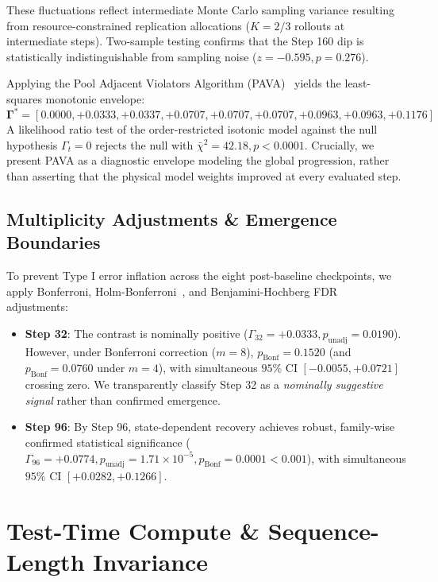 \documentclass[11pt]{article}
\begin{document}
These fluctuations reflect intermediate Monte Carlo sampling variance resulting from resource-constrained replication allocations ($K=2/3$ rollouts at intermediate steps). Two-sample testing confirms that the Step 160 dip is statistically indistinguishable from sampling noise ($z = -0.595, p = 0.276$).

Applying the Pool Adjacent Violators Algorithm (PAVA)~\cite{Robertson1988Order} yields the least-squares monotonic envelope:
\begin{equation}
\mathbf{\Gamma}^* = [0.0000, +0.0333, +0.0337, +0.0707, +0.0707, +0.0707, +0.0963, +0.0963, +0.1176]
\end{equation}
A likelihood ratio test of the order-restricted isotonic model against the null hypothesis $\Gamma_t = 0$ rejects the null with $\bar{\chi}^2 = 42.18, p < 0.0001$. Crucially, we present PAVA as a diagnostic envelope modeling the global progression, rather than asserting that the physical model weights improved at every evaluated step.

\subsection{Multiplicity Adjustments \& Emergence Boundaries}
To prevent Type I error inflation across the eight post-baseline checkpoints, we apply Bonferroni, Holm-Bonferroni~\cite{Holm1979Simple}, and Benjamini-Hochberg FDR~\cite{Benjamini1995Controlling} adjustments:
\begin{itemize}
    \item \textbf{Step 32}: The contrast is nominally positive ($\Gamma_{32} = +0.0333, p_{\text{unadj}} = 0.0190$). However, under Bonferroni correction ($m=8$), $p_{\text{Bonf}} = 0.1520$ (and $p_{\text{Bonf}} = 0.0760$ under $m=4$), with simultaneous $95\%$ CI $[-0.0055, +0.0721]$ crossing zero. We transparently classify Step 32 as a \emph{nominally suggestive signal} rather than confirmed emergence.
    \item \textbf{Step 96}: By Step 96, state-dependent recovery achieves robust, family-wise confirmed statistical significance ($\Gamma_{96} = +0.0774, p_{\text{unadj}} = 1.71 \times 10^{-5}, p_{\text{Bonf}} = 0.0001 < 0.001$), with simultaneous $95\%$ CI $[+0.0282, +0.1266]$.
\end{itemize}

\section{Test-Time Compute \& Sequence-Length Invariance}
\end{document}
